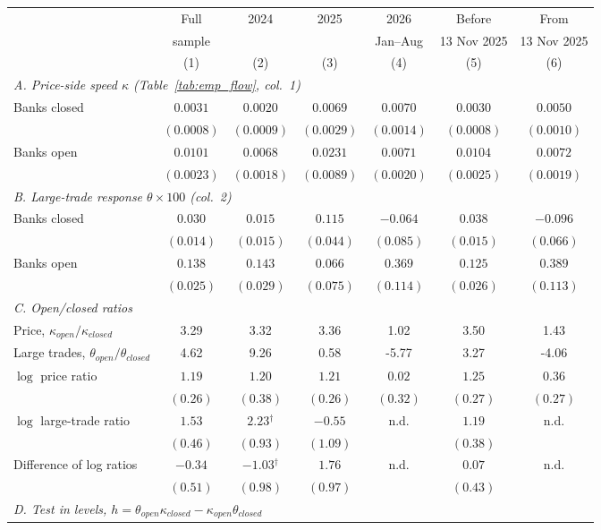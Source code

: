 \begin{tabular}{lcccccc}
\toprule
 & Full & 2024 & 2025 & 2026 & Before & From \\
 & sample &  &  & Jan--Aug & 13 Nov 2025 & 13 Nov 2025 \\
 & (1) & (2) & (3) & (4) & (5) & (6) \\
\midrule
\multicolumn{7}{l}{\emph{A. Price-side speed $\kappa$ (Table~\ref{tab:emp_flow}, col.\ 1)}} \\
Banks closed & $0.0031$ & $0.0020$ & $0.0069$ & $0.0070$ & $0.0030$ & $0.0050$ \\
 & $(0.0008)$ & $(0.0009)$ & $(0.0029)$ & $(0.0014)$ & $(0.0008)$ & $(0.0010)$ \\
Banks open & $0.0101$ & $0.0068$ & $0.0231$ & $0.0071$ & $0.0104$ & $0.0072$ \\
 & $(0.0023)$ & $(0.0018)$ & $(0.0089)$ & $(0.0020)$ & $(0.0025)$ & $(0.0019)$ \\
\multicolumn{7}{l}{\emph{B. Large-trade response $\theta\times100$ (col.\ 2)}} \\
Banks closed & $0.030$ & $0.015$ & $0.115$ & $-0.064$ & $0.038$ & $-0.096$ \\
 & $(0.014)$ & $(0.015)$ & $(0.044)$ & $(0.085)$ & $(0.015)$ & $(0.066)$ \\
Banks open & $0.138$ & $0.143$ & $0.066$ & $0.369$ & $0.125$ & $0.389$ \\
 & $(0.025)$ & $(0.029)$ & $(0.075)$ & $(0.114)$ & $(0.026)$ & $(0.113)$ \\
\midrule
\multicolumn{7}{l}{\emph{C. Open/closed ratios}} \\
Price, $\kappa_{open}/\kappa_{closed}$ & 3.29 & 3.32 & 3.36 & 1.02 & 3.50 & 1.43 \\
Large trades, $\theta_{open}/\theta_{closed}$ & 4.62 & 9.26 & 0.58 & -5.77 & 3.27 & -4.06 \\
$\log$ price ratio & $1.19$ & $1.20$ & $1.21$ & $0.02$ & $1.25$ & $0.36$ \\
 & $(0.26)$ & $(0.38)$ & $(0.26)$ & $(0.32)$ & $(0.27)$ & $(0.27)$ \\
$\log$ large-trade ratio & $1.53$ & $2.23$$^\dagger$ & $-0.55$ & n.d. & $1.19$ & n.d. \\
 & $(0.46)$ & $(0.93)$ & $(1.09)$ &  & $(0.38)$ &  \\
Difference of log ratios & $-0.34$ & $-1.03$$^\dagger$ & $1.76$ & n.d. & $0.07$ & n.d. \\
 & $(0.51)$ & $(0.98)$ & $(0.97)$ &  & $(0.43)$ &  \\
\midrule
\multicolumn{7}{l}{\emph{D. Test in levels, $h=\theta_{open}\kappa_{closed}-\kappa_{open}\theta_{closed}$}} \\

\end{tabular}

